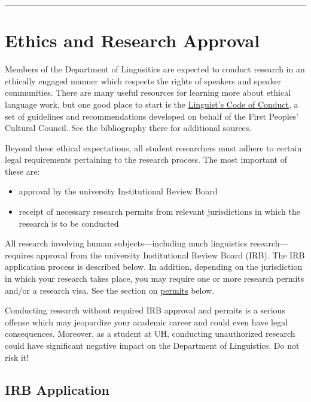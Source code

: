 \documentclass[
]{book}
\providecommand{\tightlist}{%
  \setlength{\itemsep}{0pt}\setlength{\parskip}{0pt}}
\begin{document}
\begin{center}\rule{0.5\linewidth}{0.5pt}\end{center}

\chapter{Ethics and Research Approval}\label{IRB}

Members of the Department of Lingusitics are expected to conduct research in an ethically engaged manner which respects the rights of speakers and speaker communities. There are many useful resources for learning more about ethical language work, but one good place to start is the \href{https://fpcc.ca/wp-content/uploads/2023/02/CodeOfConduct_Web.pdf}{Linguist's Code of Conduct}, a set of guidelines and recommendations developed on behalf of the First Peoples' Cultural Council. See the bibliography there for additional sources.

Beyond these ethical expectations, all student researchers must adhere to certain legal requirements pertaining to the research process. The most important of these are:

\begin{itemize}
\tightlist
\item
  approval by the university Institutional Review Board
\item
  receipt of necessary research permits from relevant jurisdictions in which the research is to be conducted
\end{itemize}

All research involving human subjects---including much linguistics research---requires approval from the university Institutional Review Board (IRB). The IRB application process is described below. In addition, depending on the jurisdiction in which your research takes place, you may require one or more research permits and/or a research visa. See the section on \hyperref[permits]{permits} below.

Conducting research without required IRB approval and permits is a serious offense which may jeopardize your academic career and could even have legal consequences. Moreover, as a student at UH, conducting unauthorized research could have significant negative impact on the Department of Linguistics. Do not risk it!

\section{IRB Application}\label{irb-application}
\end{document}
